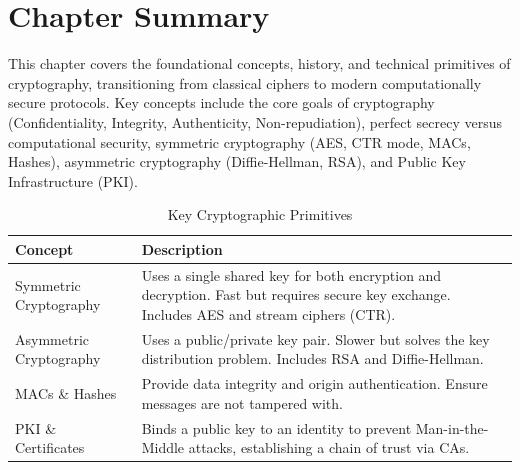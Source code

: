 \section*{Chapter Summary}
This chapter covers the foundational concepts, history, and technical primitives of cryptography, transitioning from classical ciphers to modern computationally secure protocols. Key concepts include the core goals of cryptography (Confidentiality, Integrity, Authenticity, Non-repudiation), perfect secrecy versus computational security, symmetric cryptography (AES, CTR mode, MACs, Hashes), asymmetric cryptography (Diffie-Hellman, RSA), and Public Key Infrastructure (PKI).

\begin{table}[htbp]
    \centering
    \begin{tabular}{|l|p{10cm}|}
        \hline
        \textbf{Concept} & \textbf{Description} \\
        \hline
        Symmetric Cryptography & Uses a single shared key for both encryption and decryption. Fast but requires secure key exchange. Includes AES and stream ciphers (CTR). \\
        \hline
        Asymmetric Cryptography & Uses a public/private key pair. Slower but solves the key distribution problem. Includes RSA and Diffie-Hellman. \\
        \hline
        MACs \& Hashes & Provide data integrity and origin authentication. Ensure messages are not tampered with. \\
        \hline
        PKI \& Certificates & Binds a public key to an identity to prevent Man-in-the-Middle attacks, establishing a chain of trust via CAs. \\
        \hline
    \end{tabular}
    \caption{Key Cryptographic Primitives}
    \label{tab:crypto_primitives}
\end{table}
